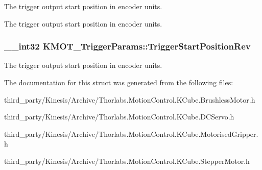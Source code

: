 The trigger output start position in encoder units. 

The trigger output start position in encoder units. 
\subsubsection[{\texorpdfstring{Trigger\+Start\+Position\+Rev}{TriggerStartPositionRev}}]{\setlength{\rightskip}{0pt plus 5cm}\+\_\+\+\_\+int32 K\+M\+O\+T\+\_\+\+Trigger\+Params\+::\+Trigger\+Start\+Position\+Rev}\hypertarget{struct_k_m_o_t___trigger_params_a6ac0dd07410aa1a60d7fc28f26856705}{}\label{struct_k_m_o_t___trigger_params_a6ac0dd07410aa1a60d7fc28f26856705}


The trigger output start position in encoder units. 



The documentation for this struct was generated from the following files\+:\begin{DoxyCompactItemize}
\item 
third\+\_\+party/\+Kinesis/\+Archive/Thorlabs.\+Motion\+Control.\+K\+Cube.\+Brushless\+Motor.\+h\item 
third\+\_\+party/\+Kinesis/\+Archive/Thorlabs.\+Motion\+Control.\+K\+Cube.\+D\+C\+Servo.\+h\item 
third\+\_\+party/\+Kinesis/\+Archive/Thorlabs.\+Motion\+Control.\+K\+Cube.\+Motorised\+Gripper.\+h\item 
third\+\_\+party/\+Kinesis/\+Archive/Thorlabs.\+Motion\+Control.\+K\+Cube.\+Stepper\+Motor.\+h\end{DoxyCompactItemize}
